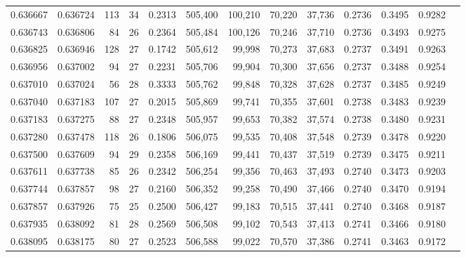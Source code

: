 \begin{tabular}{rrrrrrrrrrrrr}
0.636667 & 0.636724 &    113 &    34 &                                     0.2313 & 505,400 & 100,210 &  70,220 &  37,736 & 0.2736 & 0.3495 & 0.9282 \\
0.636743 & 0.636806 &     84 &    26 &                                     0.2364 & 505,484 & 100,126 &  70,246 &  37,710 & 0.2736 & 0.3493 & 0.9275 \\
0.636825 & 0.636946 &    128 &    27 &                                     0.1742 & 505,612 &  99,998 &  70,273 &  37,683 & 0.2737 & 0.3491 & 0.9263 \\
0.636956 & 0.637002 &     94 &    27 &                                     0.2231 & 505,706 &  99,904 &  70,300 &  37,656 & 0.2737 & 0.3488 & 0.9254 \\
0.637010 & 0.637024 &     56 &    28 &                                     0.3333 & 505,762 &  99,848 &  70,328 &  37,628 & 0.2737 & 0.3485 & 0.9249 \\
0.637040 & 0.637183 &    107 &    27 &                                     0.2015 & 505,869 &  99,741 &  70,355 &  37,601 & 0.2738 & 0.3483 & 0.9239 \\
0.637183 & 0.637275 &     88 &    27 &                                     0.2348 & 505,957 &  99,653 &  70,382 &  37,574 & 0.2738 & 0.3480 & 0.9231 \\
0.637280 & 0.637478 &    118 &    26 &                                     0.1806 & 506,075 &  99,535 &  70,408 &  37,548 & 0.2739 & 0.3478 & 0.9220 \\
0.637500 & 0.637609 &     94 &    29 &                                     0.2358 & 506,169 &  99,441 &  70,437 &  37,519 & 0.2739 & 0.3475 & 0.9211 \\
0.637611 & 0.637738 &     85 &    26 &                                     0.2342 & 506,254 &  99,356 &  70,463 &  37,493 & 0.2740 & 0.3473 & 0.9203 \\
0.637744 & 0.637857 &     98 &    27 &                                     0.2160 & 506,352 &  99,258 &  70,490 &  37,466 & 0.2740 & 0.3470 & 0.9194 \\
0.637857 & 0.637926 &     75 &    25 &                                     0.2500 & 506,427 &  99,183 &  70,515 &  37,441 & 0.2740 & 0.3468 & 0.9187 \\
0.637935 & 0.638092 &     81 &    28 &                                     0.2569 & 506,508 &  99,102 &  70,543 &  37,413 & 0.2741 & 0.3466 & 0.9180 \\
0.638095 & 0.638175 &     80 &    27 &                                     0.2523 & 506,588 &  99,022 &  70,570 &  37,386 & 0.2741 & 0.3463 & 0.9172 \\

\end{tabular}
